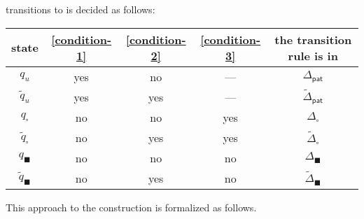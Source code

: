 \documentclass[copyright,creativecommons]{eptcs}
\begin{document}
\begin{description}
	    transitions to is decided as follows:
	    \begin{center}
	     \begin{tabular}{c|ccc|c}
	      state
	      & \ref{condition-1} 
	      & \ref{condition-2} 
	      & \ref{condition-3}
	      & the transition rule is in \\
	      \hline
$q_u$ & yes & no & --- & $\Delta_{\mathsf{pat}}$ \\
$\tilde{q}_u$ & yes & yes & --- & $\tilde{\Delta}_{\mathsf{pat}}$ \\
$q_\square$ & no & no & yes & $\Delta_\square$ \\
$\tilde{q}_\square$ & no & yes & yes &
	      $\tilde{\Delta}_\square$ \\
$q_\blacksquare$ & no & no & no & $\Delta_\blacksquare$ \\
$\tilde{q}_\blacksquare$ & no & yes & no &
	      $\tilde{\Delta}_\blacksquare$ \\
	     \end{tabular}
	    \end{center}
\end{description}
This approach to the construction is formalized as follows.
\end{document}
